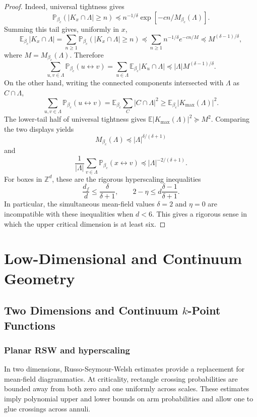 \documentclass[11pt,reqno]{book}
\numberwithin{equation}{chapter}
\theoremstyle{plain}
\theoremstyle{definition}
\theoremstyle{remark}
\renewcommand{\P}{\mathbb P}
\newcommand{\E}{\mathbb E}
\newcommand{\Z}{\mathbb Z}
\newcommand{\1}{\mathbf 1}
\newcommand{\pre}{\preceq}
\newcommand{\suc}{\succeq}
\begin{document}
\begin{proof}
Indeed, universal tightness gives
\[
  \P_{\beta_c}(|K_x\cap\Lambda|\geq n)
  \pre
  n^{-1/\delta}\exp[-c n/M_{\beta_c}(\Lambda)].
\]
Summing this tail gives, uniformly in \(x\),
\[
  \E_{\beta_c}|K_x\cap\Lambda|
  =
  \sum_{n\geq1}
  \P_{\beta_c}(|K_x\cap\Lambda|\geq n)
  \pre
  \sum_{n\geq1}
  n^{-1/\delta}e^{-c n/M}
  \pre
  M^{(\delta-1)/\delta},
\]
where \(M=M_{\beta_c}(\Lambda)\). Therefore
\[
  \sum_{u,v\in\Lambda}\P_{\beta_c}(u\leftrightarrow v)
  =
  \sum_{u\in\Lambda}\E_{\beta_c}|K_u\cap\Lambda|
  \pre
  |\Lambda|M^{(\delta-1)/\delta}.
\]
On the other hand, writing the connected components intersected with \(\Lambda\) as \(C\cap\Lambda\),
\[
  \sum_{u,v\in\Lambda}\P_{\beta_c}(u\leftrightarrow v)
  =
  \mathbb E_{\beta_c}\sum_C |C\cap\Lambda|^2
  \geq
  \mathbb E_{\beta_c}|K_{\max}(\Lambda)|^2.
\]
The lower-tail half of universal tightness gives \(\mathbb E|K_{\max}(\Lambda)|^2\suc M^2\). Comparing the two displays yields
\[
  M_{\beta_c}(\Lambda)\pre |\Lambda|^{\delta/(\delta+1)}
\]
and
\[
  \frac1{|\Lambda|}\sum_{v\in\Lambda}\P_{\beta_c}(x\leftrightarrow v)
  \pre
  |\Lambda|^{-2/(\delta+1)}.
\]
For boxes in $\Z^d$, these are the rigorous hyperscaling inequalities
\[
  \frac{d_f}{d}\leq \frac{\delta}{\delta+1},
  \qquad
  2-\eta\leq d\frac{\delta-1}{\delta+1}.
\]
In particular, the simultaneous mean-field values $\delta=2$ and $\eta=0$ are incompatible with these inequalities when $d<6$. This gives a rigorous sense in which the upper critical dimension is at least six.
\end{proof}

\part{Low-Dimensional and Continuum Geometry}

\chapter[Two Dimensions and Continuum k-Point Functions]{Two Dimensions and Continuum \(k\)-Point Functions}

\section{Planar RSW and hyperscaling}

In two dimensions, Russo-Seymour-Welsh estimates provide a replacement for mean-field diagrammatics. At criticality, rectangle crossing probabilities are bounded away from both zero and one uniformly across scales. These estimates imply polynomial upper and lower bounds on arm probabilities and allow one to glue crossings across annuli.
\end{document}
